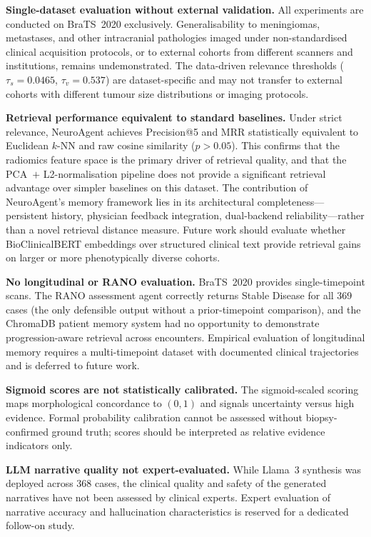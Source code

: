 \documentclass[journal]{IEEEtran}
\begin{document}
\textbf{Single-dataset evaluation without external validation.}
All experiments are conducted on BraTS~2020 exclusively. Generalisability
to meningiomas, metastases, and other intracranial pathologies imaged
under non-standardised clinical acquisition protocols, or to external
cohorts from different scanners and institutions, remains undemonstrated.
The data-driven relevance thresholds ($\tau_s = 0.0465$, $\tau_v = 0.537$)
are dataset-specific and may not transfer to external cohorts with
different tumour size distributions or imaging protocols.

\textbf{Retrieval performance equivalent to standard baselines.}
Under strict relevance, NeuroAgent achieves Precision@5 and MRR
statistically equivalent to Euclidean $k$-NN and raw cosine similarity
($p > 0.05$). This confirms that the radiomics feature space is the
primary driver of retrieval quality, and that the PCA~$+$ L2-normalisation
pipeline does not provide a significant retrieval advantage over simpler
baselines on this dataset. The contribution of NeuroAgent's memory
framework lies in its architectural completeness---persistent history,
physician feedback integration, dual-backend reliability---rather than
a novel retrieval distance measure. Future work should evaluate whether
BioClinicalBERT embeddings over structured clinical text provide
retrieval gains on larger or more phenotypically diverse cohorts.

\textbf{No longitudinal or RANO evaluation.}
BraTS~2020 provides single-timepoint scans. The RANO assessment agent
correctly returns Stable Disease for all 369 cases (the only defensible
output without a prior-timepoint comparison), and the ChromaDB patient
memory system had no opportunity to demonstrate progression-aware
retrieval across encounters. Empirical evaluation of longitudinal memory
requires a multi-timepoint dataset with documented clinical trajectories
and is deferred to future work.

\textbf{Sigmoid scores are not statistically calibrated.}
The sigmoid-scaled scoring maps morphological concordance to $(0,1)$ and
signals uncertainty versus high evidence. Formal probability calibration
cannot be assessed without biopsy-confirmed ground truth; scores should
be interpreted as relative evidence indicators only.

\textbf{LLM narrative quality not expert-evaluated.}
While Llama~3 synthesis was deployed across 368 cases, the clinical
quality and safety of the generated narratives have not been assessed by
clinical experts. Expert evaluation of narrative accuracy and hallucination
characteristics is reserved for a dedicated follow-on study.
\end{document}
